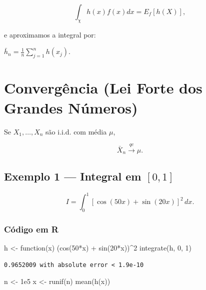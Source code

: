 \documentclass[
  letterpaper,
  DIV=11,
  numbers=noendperiod]{scrreprt}
\newenvironment{Shaded}{\begin{snugshade}}{\end{snugshade}}
\newcommand{\ControlFlowTok}[1]{\textcolor[rgb]{0.00,0.23,0.31}{#1}}
\newcommand{\DecValTok}[1]{\textcolor[rgb]{0.68,0.00,0.00}{#1}}
\newcommand{\FloatTok}[1]{\textcolor[rgb]{0.68,0.00,0.00}{#1}}
\newcommand{\FunctionTok}[1]{\textcolor[rgb]{0.28,0.35,0.67}{#1}}
\newcommand{\NormalTok}[1]{\textcolor[rgb]{0.00,0.23,0.31}{#1}}
\newcommand{\OtherTok}[1]{\textcolor[rgb]{0.00,0.23,0.31}{#1}}
\newcommand{\SpecialCharTok}[1]{\textcolor[rgb]{0.37,0.37,0.37}{#1}}
\begin{document}
\[\int_\chi h(x) f(x) dx = E_f[h(X)],\]

e aproximamos a integral por:

\(\bar h_n = \frac{1}{n} \sum_{j=1}^n h(x_j).\)

\section{Convergência (Lei Forte dos Grandes
Números)}\label{converguxeancia-lei-forte-dos-grandes-nuxfameros}

Se \(X_1,\ldots,X_n\) são i.i.d. com média \(\mu\),

\[\bar X_n \xrightarrow{qc} \mu.\]

\subsection{\texorpdfstring{Exemplo 1 --- Integral em
\([0,1]\)}{Exemplo 1 --- Integral em {[}0,1{]}}}\label{exemplo-1-integral-em-01}

\[I = \int_0^1 [\cos(50x) + \sin(20x)]^2\,dx.\]

\subsubsection{Código em R}\label{cuxf3digo-em-r}

\begin{Shaded}
\begin{Highlighting}[]
\NormalTok{h }\OtherTok{\textless{}{-}} \ControlFlowTok{function}\NormalTok{(x) (}\FunctionTok{cos}\NormalTok{(}\DecValTok{50}\SpecialCharTok{*}\NormalTok{x) }\SpecialCharTok{+} \FunctionTok{sin}\NormalTok{(}\DecValTok{20}\SpecialCharTok{*}\NormalTok{x))}\SpecialCharTok{\^{}}\DecValTok{2}
\FunctionTok{integrate}\NormalTok{(h, }\DecValTok{0}\NormalTok{, }\DecValTok{1}\NormalTok{)}
\end{Highlighting}
\end{Shaded}

\begin{verbatim}
0.9652009 with absolute error < 1.9e-10
\end{verbatim}

\begin{Shaded}
\begin{Highlighting}[]
\NormalTok{n }\OtherTok{\textless{}{-}} \FloatTok{1e5}
\NormalTok{x }\OtherTok{\textless{}{-}} \FunctionTok{runif}\NormalTok{(n)}
\FunctionTok{mean}\NormalTok{(}\FunctionTok{h}\NormalTok{(x))}
\end{Highlighting}
\end{Shaded}
\end{document}
